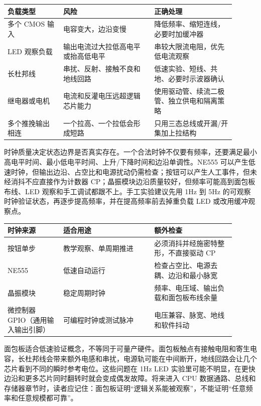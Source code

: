 \begin{longtable}{L{0.22\linewidth}L{0.36\linewidth}L{0.32\linewidth}}
\toprule
负载类型 & 风险 & 正确处理 \\
\midrule
多个 CMOS 输入 & 电容变大，边沿变慢 & 降低频率、缩短连线，必要时加缓冲器 \\\tablerowrule
LED 观察负载 & 输出电流过大拉低高电平或抬高低电平 & 串较大限流电阻，优先低电流观察 \\\tablerowrule
长杜邦线 & 串扰、反射、接触不良和地线回路 & 低速实验、短线、共地、必要时示波器确认 \\\tablerowrule
继电器或电机 & 电流和反灌电压远超逻辑芯片能力 & 使用驱动管、续流二极管、独立供电和隔离策略 \\\tablerowrule
多个推挽输出相连 & 一个拉高、一个拉低会形成短路 & 只用三态总线或开漏/开集加上拉结构 \\
\bottomrule
\end{longtable}
时钟质量决定状态边界是否真实存在。一个合法时钟不仅要有频率，还要满足最小高电平时间、最小低电平时间、上升/下降时间和边沿单调性。NE555 可以产生低速时钟，但输出边沿、占空比和电源扰动仍需检查；按钮可以产生人工事件，但未经消抖不应直接作为计数器 CP；晶振模块边沿质量较好，但频率可能高到面包板布线、LED 观察和手工调试都跟不上。手工实验建议先用 1Hz 到 5Hz 的可观察时钟验证状态，再逐步提高频率，并在提高频率前去掉重负载 LED 或改用缓冲观察点。

\begin{longtable}{L{0.22\linewidth}L{0.36\linewidth}L{0.32\linewidth}}
\toprule
时钟来源 & 适合用途 & 额外检查 \\
\midrule
按钮单步 & 教学观察、单周期推进 & 必须消抖并经施密特整形，不直接驱动 CP \\\tablerowrule
NE555 & 低速自动运行 & 检查占空比、电源去耦、边沿和最小脉宽 \\\tablerowrule
晶振模块 & 稳定周期时钟 & 频率、电压域、输出负载和面包板布线余量 \\\tablerowrule
微控制器 GPIO（通用输入输出引脚） & 可编程时钟或测试脉冲 & 电压兼容、脉宽、地线和软件抖动 \\
\bottomrule
\end{longtable}

面包板适合低速验证概念，不等同于可量产硬件。面包板触点有接触电阻和寄生电容，长杜邦线会带来额外电感和串扰，电源轨可能在中间断开，地线回路会让几个芯片看到不同的瞬时参考电位。这些问题在 1Hz LED 实验里可能不明显，在更快边沿和更多芯片同时翻转时就会变成偶发故障。将来进入 CPU 数据通路、总线和存储器章节时，读者应记住：面包板证明“逻辑关系能被观察”，不能证明“任意频率和任意规模都可靠”。

